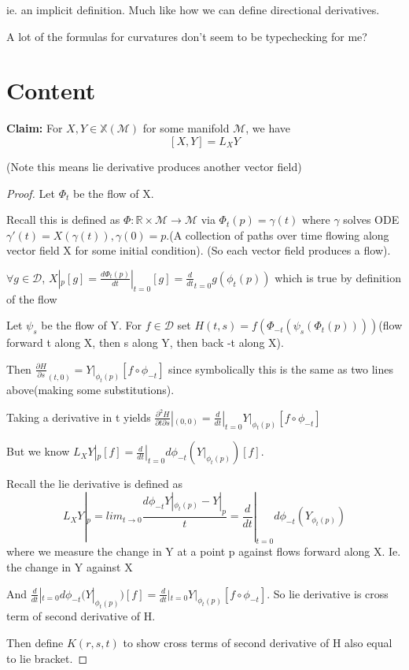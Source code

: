 \documentclass[11pt]{article}
\newcommand{\R}{\mathbb{R}}
\newcommand{\m}{\mathcal{M}}
\newcommand{\dD}{\mathcal{D}}
\begin{document}
ie. an implicit definition. Much like how we can define directional derivatives.

A lot of the formulas for curvatures don't seem to be typechecking for me?

\section{Content}

\textbf{Claim:} For $X,Y \in \mathbb{X}(\m)$ for some manifold $\m$, we have
\[
	[X,Y] = L_XY
\]

(Note this means lie derivative produces another vector field)

\begin{proof}

	Let $\Phi_t$ be the flow of X. 

	Recall this is defined as $\Phi: \R \times \m \to \m$ via $\Phi_t(p) = \gamma(t)$ where $\gamma$ solves ODE $\gamma'(t) = X(\gamma(t)), \gamma(0) = p$.(A collection of paths over time flowing along vector field X for some initial condition). (So each vector field produces a flow).

	$\forall g \in \dD$, $X|_p[g] = \frac{d\Phi_t(p)}{dt}|_{t=0}[g] = \frac{d}{dt}_{t=0}g(\phi_t(p))$ which is true by definition of the flow

	Let $\psi_s$ be the flow of Y. For $f \in \dD$ set $H(t,s) = f(\Phi_{-t}(\psi_s(\Phi_t(p))))$(flow forward t along X, then s along Y, then back -t along X). 

	Then $\frac{\partial H}{\partial s}_{(t,0)} = Y|_{\phi_t(p)} [f \circ \phi_{-t}]$ since symbolically this is the same as two lines above(making some substitutions).

	Taking a derivative in t yields $\frac{\partial^2 H}{\partial t \partial s}|_{(0,0)} = \frac{d}{dt}|_{t=0} Y|_{\phi_t(p)}[f \circ \phi_{-t}]$

	But we know $L_XY|_p[f] = \frac{d}{dt}|_{t=0} d\phi_{-t}(Y|_{\phi_t(p)})[f]$.

	Recall the lie derivative is defined as 
	\[
		L_X Y|_p = lim_{t\to 0} \frac{d\phi_{-t} Y|_{\phi_t(p)}-Y|_p}{t} = \frac{d}{dt}|_{t=0}d\phi_{-t}(Y_{\phi_t(p)})
	\]
	where we measure the change in Y at a point p against flows forward along X. Ie. the change in Y against X

	And $\frac{d}{dt}|_{t=0} d\phi_{-t}(Y|_{\phi_t(p)})[f] = \frac{d}{dt}|_{t=0} Y|_{\phi_t(p)}[f \circ \phi_{-t}]$. So lie derivative is cross term of second derivative of H.

	Then define $K(r,s,t)$ to show cross terms of second derivative of H also equal to lie bracket. 

\end{proof}
\end{document}

